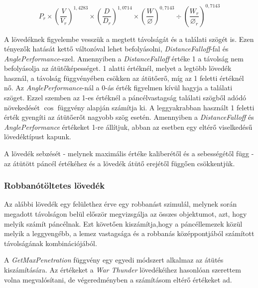 \documentclass[
]{thesis-ekf}
\theoremstyle{definition}
\theoremstyle{remark}
\begin{document}
\begin{equation}
 P_r \times \left( \frac{V}{V_r}\right)^{1,4283} \times \left( \frac{D}{D_r} \right)^{1,0714}  \times \left(\frac{W}{\varnothing}\right)^{0,7143} \div \left(\frac{W_r}{\varnothing_r}\right)^{0,7143}
 \label{demarre}
\end{equation}


A lövedéknek figyelembe vesszük a megtett távolságát és a találati szögét is. Ezen tényezők hatását kettő változóval lehet befolyásolni, \emph{DistanceFalloff}-fal és \emph{AnglePerformance}-szel. Amennyiben a \emph{DistanceFalloff} értéke 1 a távolság nem befolyásolja az átütőképességet. 1 alatti értéknél, melyet a legtöbb lövedék használ, a távolság függvényében csökken az átütőerő, míg az 1 feletti értéknél nő. Az \emph{AnglePerformance}-nál a 0-ás érték figyelmen kívül hagyja a találati szöget. Ezzel szemben az 1-es értéknél a páncélvastagság találati szögből adódó növekedését $\cos$ függvény alapján számítja ki. A leggyakrabban használt 1 feletti érték gyengíti az átütőerőt nagyobb szög esetén. Amennyiben a \emph{DistanceFalloff} és \emph{AnglePerformance} értékeket 1-re állítjuk, abban az esetben egy eltérő viselkedésű lövedéktípust kapunk.




A lövedék sebzését - melynek maximális értéke kaliberétől és a sebességétől függ - az átütött páncél értékéhez és a lövedék átütő erejétől függően csökkentjük.

\subsubsection{Robbanótöltetes lövedék}

Az alábbi lövedék egy felülethez érve egy robbanást szimulál, melynek során megadott távolságon belül először megvizsgálja az összes objektumot, azt, hogy melyik számít páncélnak. Ezt követően kiszámítja,hogy a páncéllemezek közül melyik a leggyengébb, a lemez vastagsága és a robbanás középpontjából számított távolságának kombinációjából.



A \emph{GetMaxPenetration} függvény egy egyedi módszert alkalmaz az átütés kiszámítására. Az értékeket a \emph{War Thunder} lövedékéihez hasonlóan szerettem volna megvalósítani, de végeredményben a számításom eltérő értékeket ad.
\end{document}
